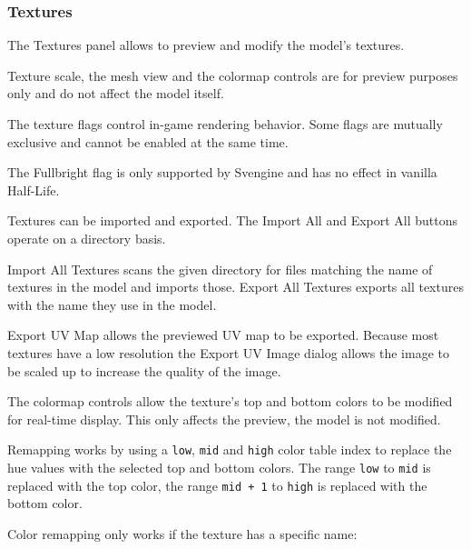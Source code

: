 \documentclass[10pt, a4paper, titlepage, oneside]{article}
\newcommand{\code}[1]{\mbox{\texttt{#1}}}
\begin{document}
\newpage

\subsubsection{Textures}

The Textures panel allows to preview and modify the model's textures.

\vspace{\baselineskip}
Texture scale, the mesh view and the colormap controls are for preview purposes only and do not affect the model itself.

\vspace{\baselineskip}
The texture flags control in-game rendering behavior. Some flags are mutually exclusive and cannot be enabled at the same time.

\vspace{\baselineskip}
The Fullbright flag is only supported by Svengine and has no effect in vanilla Half-Life.

\vspace{\baselineskip}
Textures can be imported and exported. The Import All and Export All buttons operate on a directory basis.

\vspace{\baselineskip}
Import All Textures scans the given directory for files matching the name of textures in the model and imports those. Export All Textures exports all textures with the name they use in the model.

\vspace{\baselineskip}
Export UV Map allows the previewed UV map to be exported. Because most textures have a low resolution the Export UV Image dialog allows the image to be scaled up to increase the quality of the image.

\vspace{\baselineskip}
The colormap controls allow the texture's top and bottom colors to be modified for real-time display. This only affects the preview, the model is not modified.

\vspace{\baselineskip}
Remapping works by using a \code{low}, \code{mid} and \code{high} color table index to replace the hue values with the selected top and bottom colors. The range \code{low} to \code{mid} is replaced with the top color, the range \code{mid + 1} to \code{high} is replaced with the bottom color.

\vspace{\baselineskip}
Color remapping only works if the texture has a specific name:
\end{document}
